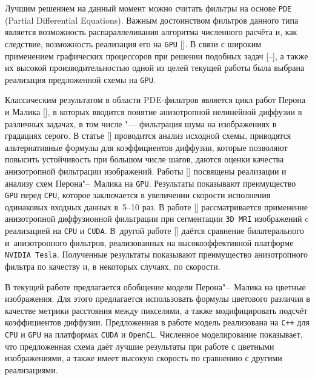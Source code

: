 Лучшим решением на данный момент можно считать фильтры на 
основе {\tt PDE} (Partial Differential Equations). 
Важным достоинством фильтров данного типа является
возможность распараллеливания алгоритма численного расчёта 
и, как следствие, возможность реализация его на {\tt GPU} [].
В связи с широким применением графических процессоров при решении подобных задач
[--],
а также их высокой производительностью одной из целей текущей работы 
была выбрана реализация предложенной схемы на {\tt GPU}.

Классическим результатом в области PDE-фильтров является цикл работ Перона и Малика [],  в которых вводится понятие анизотропной нелинейной диффузии в различных
задачах, в том числе "--- фильтрация шума на изображениях в градациях серого.
В статье [] проводится анализ исходной
схемы, приводятся альтернативные формулы для коэффициентов
диффузии, которые позволяют повысить устойчивость при большом числе
шагов, даются оценки качества анизотропной фильтрации изображений. 
Работы [] посвящены
реализации и анализу схем Перона"--~Малика на {\tt GPU}. 
Результаты показывают преимущество {\tt GPU} перед {\tt CPU}, которое заключается в увеличении скорости исполнения одинаковых входных данных в~5--10 раз. 
В работе [] 
рассматривается  применение анизотропной диффузионной фильтрации при сегментации
{\tt 3D MRI} изображений c реализацией на {\tt CPU} и {\tt CUDA}. 
В~другой работе  [] даётся сравнение билатерального и~анизотропного фильтров, реализованных на высокоэффективной  платформе {\tt NVIDIA Tesla}. Полученные результаты показывают преимущество
анизотропного фильтра по качеству и, в некоторых случаях, по скорости.

В текущей работе предлагается обобщение модели  Перона"--~Малика на цветные изображения. Для этого предлагается
использовать формулы цветового различия в качестве метрики расстояния между пикселями, а также модифицировать подсчёт 
коэффициентов диффузии. 
Предложенная в работе модель реализована  на {\tt C++} для {\tt CPU} и {\tt GPU} на платформах {\tt CUDA} и {\tt OpenCL}. 
Численное моделирование показывает, что предложенная схема даёт лучшие  результаты при работе с цветными изображениями, а 
также имеет высокую скорость по сравнению с другими реализациями.

\smallskip

